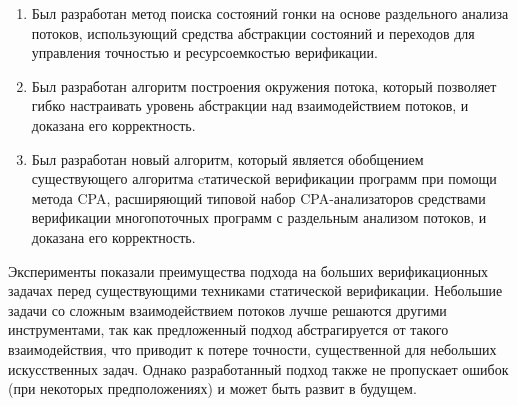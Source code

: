 

\begin{enumerate}
  \item Был разработан метод поиска состояний гонки на основе раздельного анализа потоков, использующий средства абстракции состояний и переходов для управления точностью и ресурсоемкостью верификации.
  \item Был разработан алгоритм построения окружения потока, который позволяет гибко настраивать уровень абстракции над взаимодействием потоков, и доказана его корректность.
  \item Был разработан новый алгоритм, который является обобщением существующего алгоритма cтатической верификации программ при помощи метода CPA, расширяющий типовой набор CPA-анализаторов средствами верификации многопоточных программ с раздельным анализом потоков, и доказана его корректность.
\end{enumerate}

Эксперименты показали преимущества подхода на больших верификационных задачах перед существующими техниками статической верификации.
Небольшие задачи со сложным взаимодействием потоков лучше решаются другими инструментами, так как предложенный подход абстрагируется от такого взаимодействия, что приводит к потере точности, существенной для небольших искусственных задач.
Однако разработанный подход также не пропускает ошибок (при некоторых предположениях) и может быть развит в будущем.

